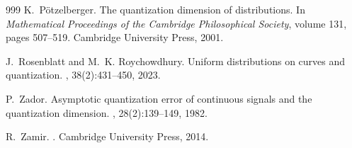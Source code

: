 \documentclass[12pt, reqno]{amsart}
\theoremstyle{plain}
\theoremstyle{definition}
\begin{document}
\begin{thebibliography}{999}
K.~P{\"o}tzelberger.
\newblock The quantization dimension of distributions.
\newblock In {\em Mathematical Proceedings of the Cambridge Philosophical
  Society}, volume 131, pages 507--519. Cambridge University Press, 2001.

J.~Rosenblatt and M.~K. Roychowdhury.
\newblock Uniform distributions on curves and quantization.
,
  38(2):431--450, 2023.

%
%

P.~Zador.
\newblock Asymptotic quantization error of continuous signals and the
  quantization dimension.
, 28(2):139--149, 1982.

R.~Zamir.
.
\newblock Cambridge University Press, 2014.

\end{thebibliography}
\end{document}
